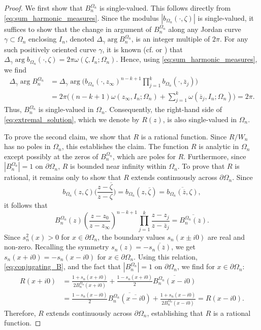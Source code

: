 \documentclass[12pt,oneside,reqno]{amsart}
\theoremstyle{definition}
\numberwithin{equation}{section}
\begin{document}
\begin{proof}
We first show that \(B_n^{\Omega_n}\) is single-valued. This follows directly from \eqref{eq:sum_harmonic_measures}. Since the modulus $|b_{\Omega_n}(\cdot,\zeta)|$ is single-valued, it suffices to show that the change in argument of $B_n^{\Omega_n}$ along any Jordan curve $\gamma \subset \Omega_n$ enclosing $I_n$, denoted $\Delta_{\gamma} \arg B_n^{\Omega_n}$, is an integer multiple of $2\pi$. For any such positively oriented curve $\gamma$, it is known (cf. \cite[\S 5.2, Ch.]{ahlfors78} or \cite[Ch.]{widom69}) that $\Delta_{\gamma} \arg b_{\Omega_n}(\cdot,\zeta)=2\pi\omega(\zeta, I_n;\Omega_n)$. Hence, using \eqref{eq:sum_harmonic_measures}, we find
\begin{align*}
\Delta_{\gamma} \arg B_n^{\Omega_n} &=
\Delta_{\gamma} \arg \biggl(b_{\Omega_n}(\cdot,z_\infty)^{n-k+1}\prod_{j=1}^{k}b_{\Omega_n}(\cdot,\overline{z}_j)\biggr) \\
&= 2\pi\biggl((n-k+1)\omega(z_\infty,I_n;\Omega_n)+\sum_{j=1}^{k}\omega(\overline{z}_j,I_n;\Omega_n)\biggr) = 2\pi.
\end{align*}
Thus, \(B_n^{\Omega_n}\) is single-valued in $\Omega_n$. Consequently, the right-hand side of \eqref{eq:extremal_solution}, which we denote by $R(z)$, is also single-valued in $\Omega_n$.

To prove the second claim, we show that $R$ is a rational function. Since $R/W_n$ has no poles in $\Omega_n$, this establishes the claim. The function $R$ is analytic in $\Omega_n$ except possibly at the zeros of $B_n^{\Omega_n}$, which are poles for $R$. Furthermore, since \(|B_n^{\Omega_n}| = 1\) on \(\partial \Omega_n\), $R$ is bounded near infinity within $\Omega_n$. To prove that $R$ is rational, it remains only to show that $R$ extends continuously across $\partial \Omega_n$. Since
\[ b_{\Omega_n}(z,\zeta)\biggl(\frac{z-\overline{\zeta}}{z-\zeta}\biggr) = b_{\Omega_n}(z,\overline{\zeta}) = \overline{b_{\Omega_n}(\overline{z},\zeta)}, \]
it follows that
\begin{equation}
	B_n^{\Omega_n}(z)\left(\frac{z-z_0}{z-z_\infty}\right)^{n-k+1}
	\prod_{j=1}^{k}\frac{z-z_j}{z-\overline{z}_j} = \overline{B_n^{\Omega_n}(\overline{z})}.
	\label{eq:conjugating_B}
\end{equation}
Since $s_n^2(x) > 0$ for $x \in \partial \Omega_n$, the boundary values $s_n(x\pm i0)$ are real and non-zero. Recalling the symmetry $s_n(z) = -\overline{s_n(\overline{z})}$, we get $s_n(x+i0) = -s_n(x-i0)$ for $x \in \partial \Omega_n$. Using this relation, \eqref{eq:conjugating_B}, and the fact that $|B_n^{\Omega_n}|=1$ on $\partial \Omega_n$, we find for $x \in \partial \Omega_n$:
\begin{align*}
	R(x+i0) &= \frac{1+s_n(x+i0)}{2B_n^{\Omega_n}(x+i0)}+\frac{1-s_n(x+i0)}{2}\overline{B_n^{\Omega_n}(x-i0)} \\
	& = \frac{1-s_n(x-i0)}{2}\overline{B_n^{\Omega_n}(\overline{x-i0})}+\frac{1+s_n(x-i0)}{2B_n^{\Omega_n}(x-i0)}
	= R(x-i0).
\end{align*}
Therefore, $R$ extends continuously across $\partial \Omega_n$, establishing that $R$ is a rational function.
\end{proof}
\end{document}
